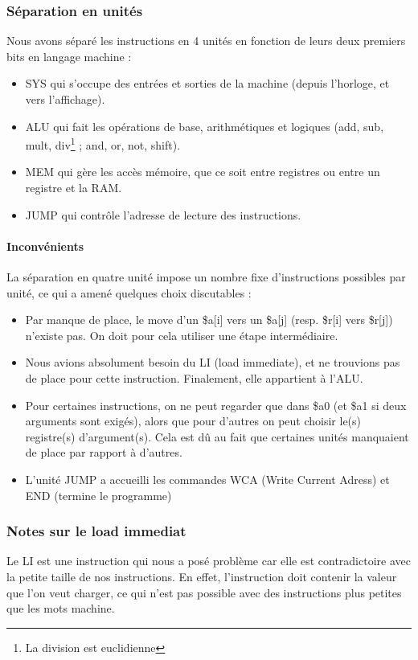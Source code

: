 \documentclass{article}
\begin{document}
\subsubsection{Séparation en unités}
Nous avons séparé les instructions en 4 unités en fonction de leurs
deux premiers bits en langage machine :
\begin{itemize}
  \item SYS qui s'occupe des entrées et sorties de la machine (depuis
    l'horloge, et vers l'affichage).
  \item ALU qui fait les opérations de base, arithmétiques et logiques (add,
    sub, mult, div\footnote{La division est euclidienne} ; and, or, not, shift).
  \item MEM qui gère les accès mémoire, que ce soit entre registres ou entre un
  registre et la RAM.
  \item JUMP qui contrôle l'adresse de lecture des instructions.
\end{itemize}

\paragraph{Inconvénients}
La séparation en quatre unité impose un nombre fixe d'instructions possibles
par unité, ce qui a amené quelques choix discutables :
\begin{itemize}
  \item Par manque de place, le move d'un \$a[i] vers un \$a[j]
    (resp. \$r[i] vers \$r[j]) n'existe pas. On doit pour cela utiliser une
    étape intermédiaire.
  \item Nous avions absolument besoin du LI (load immediate), et ne trouvions
    pas de place pour cette instruction. Finalement, elle appartient à l'ALU.
  \item Pour certaines instructions, on ne peut regarder que dans \$a0 (et \$a1
    si deux arguments sont exigés), alors que pour d'autres on peut choisir
    le(s) registre(s) d'argument(s). Cela est dû au fait que certaines unités
    manquaient de place par rapport à d'autres.
  \item L'unité JUMP a accueilli les commandes WCA (Write Current Adress) et
    END (termine le programme)
\end{itemize}


\subsubsection{Notes sur le load immediat}
Le LI est une instruction qui nous a posé problème car elle est contradictoire
avec la petite taille de nos instructions. En effet, l'instruction doit contenir
la valeur que l'on veut charger, ce qui n'est pas possible avec des instructions
plus petites que les mots machine.
\end{document}
